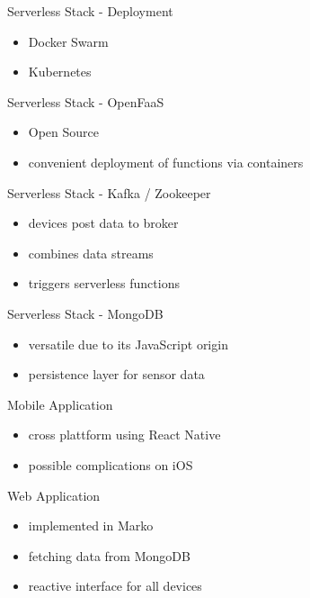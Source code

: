 \documentclass[aspectratio=1610]{beamer}
\begin{document}
  \begin{frame}{Serverless Stack - Deployment}
    \begin{itemize}
      \item Docker Swarm
      \item Kubernetes
    \end{itemize}
  \end{frame}

  \begin{frame}{Serverless Stack - OpenFaaS}
    \begin{itemize}
      \item Open Source
      \item convenient deployment of functions via containers
    \end{itemize}
  \end{frame}

  \begin{frame}{Serverless Stack - Kafka / Zookeeper}
    \begin{itemize}
      \item devices post data to broker
      \item combines data streams
      \item triggers serverless functions
    \end{itemize}
  \end{frame}

  \begin{frame}{Serverless Stack - MongoDB}
    \begin{itemize}
      \item versatile due to its JavaScript origin
      \item persistence layer for sensor data
    \end{itemize}
  \end{frame}

  \begin{frame}{Mobile Application}
    \begin{itemize}
      \item cross plattform using React Native
      \item possible complications on iOS
    \end{itemize}
  \end{frame}

  \begin{frame}{Web Application}
    \begin{itemize}
      \item implemented in Marko
      \item fetching data from MongoDB
      \item reactive interface for all devices
    \end{itemize}
  \end{frame}
\end{document}
